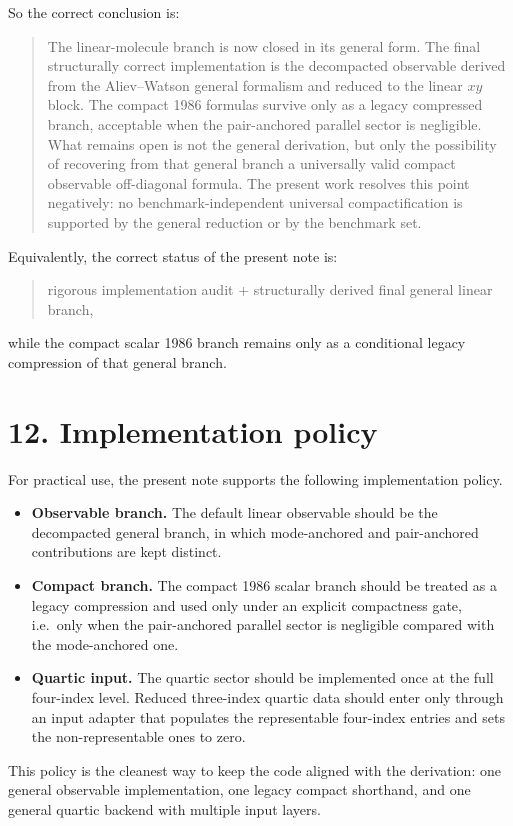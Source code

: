 \documentclass[11pt]{article}
\begin{document}
So the correct conclusion is:

\begin{quote}
The linear-molecule branch is now closed in its general form. The final
structurally correct implementation is the decompacted observable derived from
the Aliev--Watson general formalism and reduced to the linear $xy$ block. The
compact 1986 formulas survive only as a legacy compressed branch, acceptable
when the pair-anchored parallel sector is negligible. What remains open is not
the general derivation, but only the possibility of recovering from that
general branch a universally valid compact observable off-diagonal formula. The
present work resolves this point negatively: no benchmark-independent universal
compactification is supported by the general reduction or by the benchmark set.
\end{quote}

Equivalently, the correct status of the present note is:
\begin{quote}
rigorous implementation audit + structurally derived final general linear branch,
\end{quote}
while the compact scalar 1986 branch remains only as a conditional legacy
compression of that general branch.

\section*{12. Implementation policy}

For practical use, the present note supports the following implementation
policy.

\begin{itemize}
\item \textbf{Observable branch.} The default linear observable should be the
decompacted general branch, in which mode-anchored and pair-anchored
contributions are kept distinct.
\item \textbf{Compact branch.} The compact 1986 scalar branch should be treated
as a legacy compression and used only under an explicit compactness gate, i.e.\
only when the pair-anchored parallel sector is negligible compared with the
mode-anchored one.
\item \textbf{Quartic input.} The quartic sector should be implemented once at
the full four-index level. Reduced three-index quartic data should enter only
through an input adapter that populates the representable four-index entries
and sets the non-representable ones to zero.
\end{itemize}

This policy is the cleanest way to keep the code aligned with the derivation:
one general observable implementation, one legacy compact shorthand, and one
general quartic backend with multiple input layers.
\end{document}
